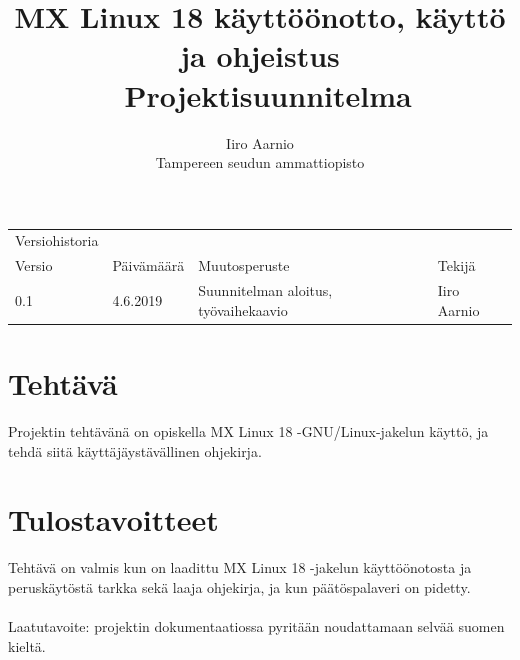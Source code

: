 \documentclass[a4paper, 12pt, finnish]{article}
\begin{document}
\title{MX Linux 18 käyttöönotto, käyttö ja ohjeistus \\ \large Projektisuunnitelma}
\author{Iiro Aarnio\\ Tampereen seudun ammattiopisto}
\maketitle
\thispagestyle{empty}
\newpage
\thispagestyle{empty}
\newpage
\begin{table}[htpb]
\begin{tabular}{llll}
Versiohistoria &            &                         &             \\
\rowcolor[HTML]{FFCCC9}
Versio         & Päivämäärä & Muutosperuste           & Tekijä      \\
0.1              & 4.6.2019   & Suunnitelman aloitus, työvaihekaavio       & Iiro Aarnio \\
\end{tabular}
\end{table}

\newpage
\thispagestyle{empty}
\tableofcontents
\newpage
\section{Tehtävä}
Projektin tehtävänä on opiskella MX Linux 18 -GNU/Linux-jakelun käyttö, ja tehdä siitä käyttäjäystävällinen ohjekirja. 

\section{Tulostavoitteet}
Tehtävä on valmis kun on laadittu MX Linux 18 -jakelun käyttöönotosta ja peruskäytöstä tarkka sekä laaja ohjekirja, ja kun päätöspalaveri on pidetty.
\\\\
Laatutavoite: projektin dokumentaatiossa pyritään noudattamaan selvää suomen kieltä.
\end{document}
